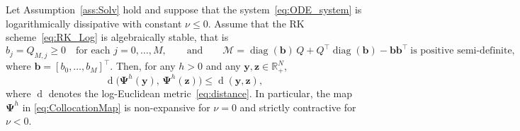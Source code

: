 \documentclass[10pt,a4paper]{amsart}
\begin{document}
\begin{theorem}
\label{thm:NonlinContr}
    Let Assumption~\ref{ass:Solv} hold and suppose that 
    the system~\eqref{eq:ODE_system} is logarithmically 
    dissipative with constant $\nu\leq 0$. Assume that 
    the RK scheme~\eqref{eq:RK_Log} is algebraically 
    stable, that is
    \begin{equation}\label{eq:Algebraic_Stability}
        b_j = Q_{M,j} \geq 0
        \quad \text{for each } j=0,\dots,M,
        \qquad \text{and} \qquad
        \bm{\mathcal{M}}
        = \operatorname{diag}(\bm{b})\,Q
          + Q^\top\operatorname{diag}(\bm{b})
          - \bm{b}\bm{b}^\top
        \ \text{is positive semi-definite,}
    \end{equation}
    where $\bm{b}=[b_0,\dots,b_M]^\top$.
    Then, for any $h>0$ and any 
    $\bm{y},\bm{z}\in\mathbb{R}_{+}^{N}$,
    \begin{equation}\label{eq:ContractColloc}
        \operatorname{d}\bigl(
          \bm{\Psi}^h(\bm{y}),\,
          \bm{\Psi}^h(\bm{z})
        \bigr)
        \leq \operatorname{d}(\bm{y},\bm{z}),
    \end{equation}
    where $\operatorname{d}$ denotes the log-Euclidean 
    metric~\eqref{eq:distance}. In particular, 
    the map $\bm{\Psi}^h$ in \eqref{eq:CollocationMap} is non-expansive for $\nu=0$ and 
    strictly contractive for $\nu<0$.
\end{theorem}
\end{document}
